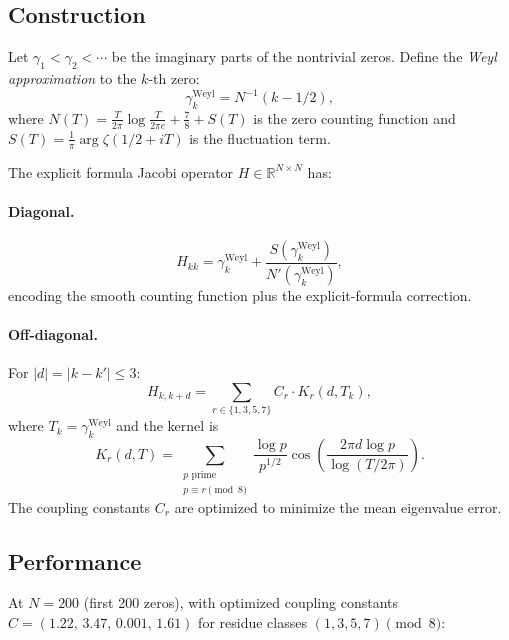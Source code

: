 \documentclass[11pt,a4paper]{article}
\begin{document}
\subsection{Construction}

Let $\gamma_1 < \gamma_2 < \cdots$ be the imaginary parts of the nontrivial zeros.
Define the \emph{Weyl approximation} to the $k$-th zero:
\begin{equation}
\gamma_k^{\mathrm{Weyl}} = N^{-1}(k - 1/2),
\end{equation}
where $N(T) = \frac{T}{2\pi}\log\frac{T}{2\pi e} + \frac{7}{8} + S(T)$ is the zero counting function and $S(T) = \frac{1}{\pi}\arg\zeta(1/2 + iT)$ is the fluctuation term.

The explicit formula Jacobi operator $H \in \mathbb{R}^{N \times N}$ has:

\paragraph{Diagonal.}
\begin{equation}\label{eq:diag}
H_{kk} = \gamma_k^{\mathrm{Weyl}} + \frac{S(\gamma_k^{\mathrm{Weyl}})}{N'(\gamma_k^{\mathrm{Weyl}})},
\end{equation}
encoding the smooth counting function plus the explicit-formula correction.

\paragraph{Off-diagonal.}
For $|d| = |k - k'| \leq 3$:
\begin{equation}\label{eq:offdiag}
H_{k,k+d} = \sum_{r \in \{1,3,5,7\}} C_r \cdot K_r(d, T_k),
\end{equation}
where $T_k = \gamma_k^{\mathrm{Weyl}}$ and the kernel is
\begin{equation}
K_r(d, T) = \sum_{\substack{p \text{ prime} \\ p \equiv r \pmod{8}}} \frac{\log p}{p^{1/2}} \cos\!\left(\frac{2\pi d \log p}{\log(T/2\pi)}\right).
\end{equation}
The coupling constants $C_r$ are optimized to minimize the mean eigenvalue error.

\subsection{Performance}

At $N = 200$ (first 200 zeros), with optimized coupling constants $C = (1.22,\, 3.47,\, 0.001,\, 1.61)$ for residue classes $(1, 3, 5, 7) \pmod{8}$:
\end{document}
